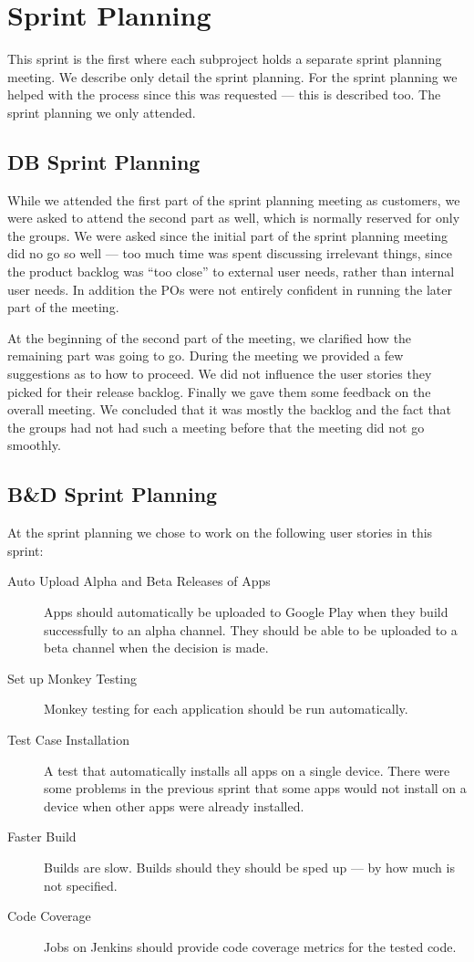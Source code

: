 \chapter{Sprint Planning}
This sprint is the first where each subproject holds a separate sprint planning meeting. We describe only detail the \bd sprint planning. For the \db sprint planning we helped with the process since this was requested --- this is described too. The \gui sprint planning we only attended.

\section{DB Sprint Planning}
While we attended the first part of the \db sprint planning meeting as customers, we were asked to attend the second part as well, which is normally reserved for only the \db groups. We were asked since the initial part of the sprint planning meeting did no go so well --- too much time was spent discussing irrelevant things, since the product backlog was ``too close'' to external user needs, rather than internal user needs. In addition the \db POs were not entirely confident in running the later part of the meeting.

At the beginning of the second part of the meeting, we clarified how the remaining part was going to go. During the meeting we provided a few suggestions as to how to proceed. We did not influence the user stories they picked for their release backlog. Finally we gave them some feedback on the overall meeting. We concluded that it was mostly the backlog and the fact that the \db groups had not had such a meeting before that the meeting did not go smoothly.

\section{B\&D Sprint Planning}
At the \bd sprint planning we chose to work on the following user stories in this sprint:

\begin{description}
  \item[Auto Upload Alpha and Beta Releases of Apps] Apps should automatically be uploaded to Google Play when they build successfully to an alpha channel. They should be able to be uploaded to a beta channel when the decision is made.
  \item[Set up Monkey Testing] Monkey testing for each application should be run automatically.
  \item[Test Case Installation] A test that automatically installs all apps on a single device. There were some problems in the previous sprint that some apps would not install on a device when other apps were already installed.
  \item[Faster Build] Builds are slow. Builds should they should be sped up --- by how much is not specified.
  \item[Code Coverage] Jobs on Jenkins should provide code coverage metrics for the tested code.
\end{description}

